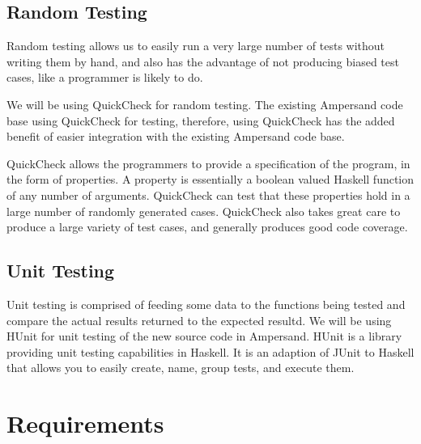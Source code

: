 \documentclass[12pt]{report}
\begin{document}
\subsection{Random Testing}\label{subsec:RandTest}
Random testing allows us to easily run a very large number of tests without
writing them by hand, and also has the advantage of not producing biased test
cases, like a programmer is likely to do.

We will be using QuickCheck  for random testing. The existing Ampersand code base
using QuickCheck for testing, therefore, using QuickCheck has the added benefit
of easier integration with the existing Ampersand code base.

QuickCheck allows the programmers to provide a specification of the program, in
the form of properties. A property is essentially a boolean valued Haskell
function of any number of arguments. QuickCheck can test that these properties
hold in a large number of randomly generated cases. QuickCheck also takes great
care to produce a large variety of test cases, and generally produces good code
coverage.



\subsection{Unit Testing}\label{subsec:UnitTest}
Unit testing is comprised of feeding some data to the functions being tested and
compare the actual results returned to the expected resultd.
We will be using HUnit for unit testing of the new source code in Ampersand. HUnit is a library providing unit
testing capabilities in Haskell.  It is an adaption of JUnit to Haskell that
allows you to easily create, name, group tests, and execute them.

\section{Requirements}\label{sec:Reqs}
\end{document}
